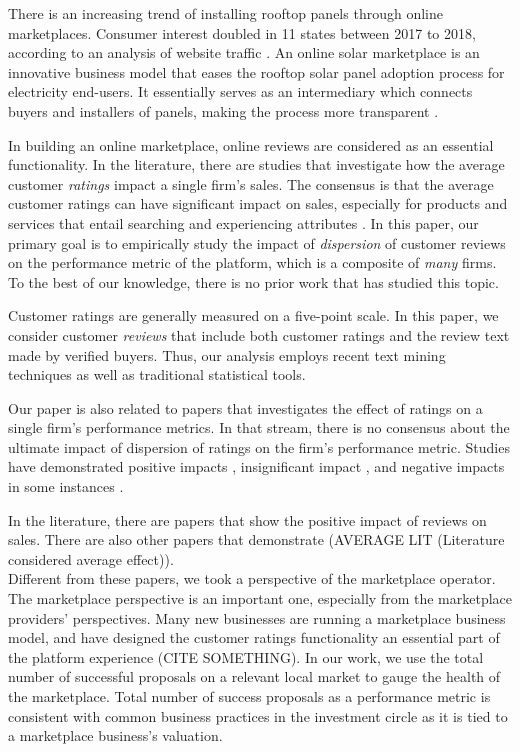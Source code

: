 \documentclass[msom,blindrev]{informs3}
\begin{document}
There is an increasing trend of installing rooftop panels through online marketplaces. Consumer interest doubled in 11 states between 2017 to 2018, according to an analysis of website traffic \citep{energysageintel19}.
An online solar marketplace is an innovative business model that eases the rooftop solar panel adoption process for electricity end-users. It essentially serves as an intermediary which connects buyers and installers of panels, making the process more transparent \citep{dorsey2019access}.

In building an online marketplace, online reviews are considered as an essential functionality. In the literature, there are studies that investigate how the average customer \emph{ratings} impact a single firm's sales. The consensus is that the average customer ratings can have significant impact on sales, especially for products and services that entail searching and experiencing attributes \citep{zimmermann2018decomposing}. In this paper, our primary goal is to empirically study the impact of \emph{dispersion} of customer reviews on the performance metric of the platform, which is a composite of \emph{many} firms. To the best of our knowledge, there is no prior work that has studied this topic.

Customer ratings are generally measured on a five-point scale. In this paper, we consider customer \emph{reviews} that include both customer ratings and the review text made by verified buyers. Thus, our analysis employs recent text mining techniques as well as traditional statistical tools.


Our paper is also related to papers that investigates the effect of ratings on a single firm's performance metrics. In that stream, there is no consensus about the ultimate impact of dispersion of ratings on the firm's performance metric. Studies have demonstrated positive impacts \citep{chintagunta2010effects,chevalier2006effect,dellarocas2007exploring}, insignificant impact \citep{duan2008online}, and negative impacts in some instances \citep{wang2015user}.

In the literature, there are papers that show the positive impact of reviews on sales. There are also other papers that demonstrate  (AVERAGE LIT (Literature considered average effect)).\\




Different from these papers, we took a perspective of the marketplace operator. The marketplace perspective is an important one, especially from the marketplace providers' perspectives. Many new businesses are running a marketplace business model, and have designed the customer ratings functionality an essential part of the platform experience (CITE SOMETHING). In our work, we use the total number of successful proposals on a relevant local market to gauge the health of the marketplace. Total number of success proposals as a performance metric is consistent with common business practices in the investment circle \citep{boris_2018,galston_2017} as it is tied to a marketplace business's valuation. \\
\end{document}
